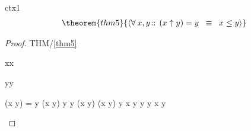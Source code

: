 \documentclass[12pt]{amsart}
\begin{document}
\begin{context}{ctx1}
\begin{align}
\theorem{thm5}{ \qforall{x,y}{}{ (x \uparrow y) = y \2\equiv x \le y } }
\end{align}

\begin{proof}{THM/\ref{thm5}}
	\begin{free:var}{x}{x}
	\begin{free:var}{y}{y}
\begin{calculation}
		(x \uparrow y) = y
	\hint{=}{ \eqref{axm0} }
		(x \uparrow y) \le y \2\land y \le (x \uparrow y)
		(x \uparrow y) \le y
	\hint{=}{ \eqref{axm1} }
		x  \le y \2\land y \le y
	\hint{=}{ \eqref{axm0} }
		x  \le y
\end{calculation}
	\end{free:var}
	\end{free:var}
\end{proof}

\end{context}
\end{document}

